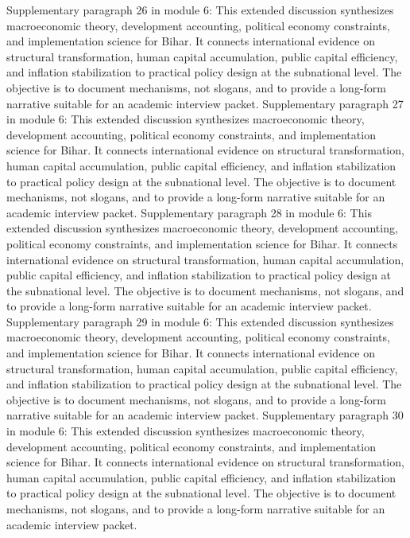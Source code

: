 \documentclass[preprint,12pt]{elsarticle}
\begin{document}
Supplementary paragraph 26 in module 6: This extended discussion synthesizes macroeconomic theory, development accounting, political economy constraints, and implementation science for Bihar. It connects international evidence on structural transformation, human capital accumulation, public capital efficiency, and inflation stabilization to practical policy design at the subnational level. The objective is to document mechanisms, not slogans, and to provide a long-form narrative suitable for an academic interview packet.
Supplementary paragraph 27 in module 6: This extended discussion synthesizes macroeconomic theory, development accounting, political economy constraints, and implementation science for Bihar. It connects international evidence on structural transformation, human capital accumulation, public capital efficiency, and inflation stabilization to practical policy design at the subnational level. The objective is to document mechanisms, not slogans, and to provide a long-form narrative suitable for an academic interview packet.
Supplementary paragraph 28 in module 6: This extended discussion synthesizes macroeconomic theory, development accounting, political economy constraints, and implementation science for Bihar. It connects international evidence on structural transformation, human capital accumulation, public capital efficiency, and inflation stabilization to practical policy design at the subnational level. The objective is to document mechanisms, not slogans, and to provide a long-form narrative suitable for an academic interview packet.
Supplementary paragraph 29 in module 6: This extended discussion synthesizes macroeconomic theory, development accounting, political economy constraints, and implementation science for Bihar. It connects international evidence on structural transformation, human capital accumulation, public capital efficiency, and inflation stabilization to practical policy design at the subnational level. The objective is to document mechanisms, not slogans, and to provide a long-form narrative suitable for an academic interview packet.
Supplementary paragraph 30 in module 6: This extended discussion synthesizes macroeconomic theory, development accounting, political economy constraints, and implementation science for Bihar. It connects international evidence on structural transformation, human capital accumulation, public capital efficiency, and inflation stabilization to practical policy design at the subnational level. The objective is to document mechanisms, not slogans, and to provide a long-form narrative suitable for an academic interview packet.
\end{document}
